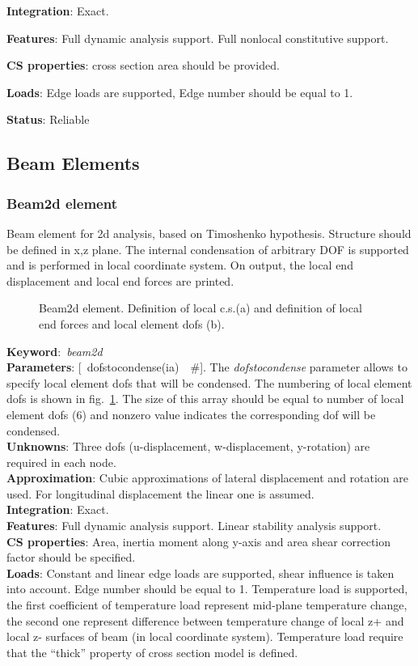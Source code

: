 \documentclass[12pt,dvips]{article}
\newcommand{\descitem}[1]{{\noindent \bf #1}:}
\newcommand{\elemkeyword}[1]{\descitem{Keyword}~{\em #1}}
\newcommand{\elemparam}[2]{{{#1\tiny (#2)}~~\#}}
\newcommand{\optelemparam}[2]{{[~\elemparam{#1}{#2}]}}
\newcommand{\param}[1]{{\it #1}}
\begin{document}
\descitem{Integration} Exact.

\descitem{Features} Full dynamic analysis support. Full nonlocal
constitutive support.

\descitem{CS properties} cross section area should be
provided.

\descitem{Loads} Edge loads are supported, Edge number should be equal
to 1.

\descitem{Status} Reliable

\subsection{Beam Elements}
\subsubsection{Beam2d element}
Beam element for 2d analysis, based on Timoshenko hypothesis. Structure should be defined in x,z
plane. The internal condensation
of arbitrary DOF is supported and is performed in local coordinate
system. On output, the local end displacement and local end forces are
printed. 

\begin{figure}[tb]
\begin{center}\end{center}
\caption{Beam2d element. Definition of local c.s.(a)  and definition of
local end forces and local element dofs (b).}
\label{beam2dfig}
\end{figure}

\elemkeyword{beam2d}\\
\descitem{Parameters} \optelemparam{dofstocondense}{ia}. The
\param{dofstocondense} parameter allows to specify local element dofs that
will be condensed. The numbering of local element dofs is shown in
fig.~\ref{beam2dfig}. The size of this array should be equal to
number of local element dofs (6) and nonzero value indicates the
corresponding dof will be condensed.\\
\descitem{Unknowns}
Three dofs (u-displacement, w-displacement, y-rotation) are required
in each node.\\
\descitem{Approximation} Cubic  approximations of lateral displacement and
rotation are used. For longitudinal displacement the linear one is
assumed.\\
\descitem{Integration} Exact.\\
\descitem{Features} Full dynamic analysis support. Linear stability
analysis support.\\
\descitem{CS properties} Area,
inertia moment along y-axis and area shear correction factor should be specified.\\ 
\descitem{Loads}  Constant and linear edge loads are supported, shear
influence is taken into account. 
Edge number should be equal to 1. Temperature load is
supported, the first coefficient of temperature load represent
mid-plane temperature change, the second one represent difference
between temperature change of local z+ and local z- surfaces of beam (in local coordinate
system). Temperature load require that the ``thick'' property of cross
section model is defined.
\end{document}
